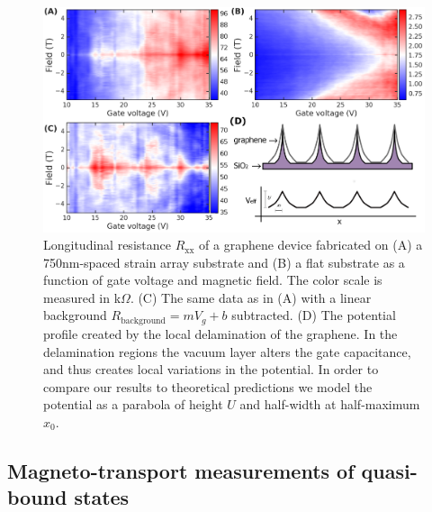 \documentclass[edeposit,fullpage,draftthesis]{uiucthesis2009}
\begin{document}
            \begin{figure}
            \centering
            \includegraphics[width=\columnwidth]{images/resultsanddiscussion/strainarraypaper/Figure4_2}
            \caption[Magneto-transport measurements of graphene on strain array substrates]{
                Longitudinal resistance $R_\text{xx}$ of a graphene device fabricated on (A) a 750nm-spaced
                strain array substrate and (B) a flat substrate as a function of gate voltage and magnetic field. 
                The color scale is measured in k$\Omega$.
                (C) The same data as in (A) with a linear background $R_\text{background} = m V_g + b$ subtracted.
                (D) The potential profile created by the local delamination of the graphene. In the delamination
                regions the vacuum layer alters the gate capacitance, and thus creates local variations in the potential. 
                In order to compare our results to theoretical predictions we model the potential as a parabola
                of height $U$ and half-width at half-maximum $x_0$.
            }
            \label{'fig:transport'}
            \end{figure}
            
    \subsection{Magneto-transport measurements of quasi-bound states}
    \label{sec:sa_project}
            
\end{document}
